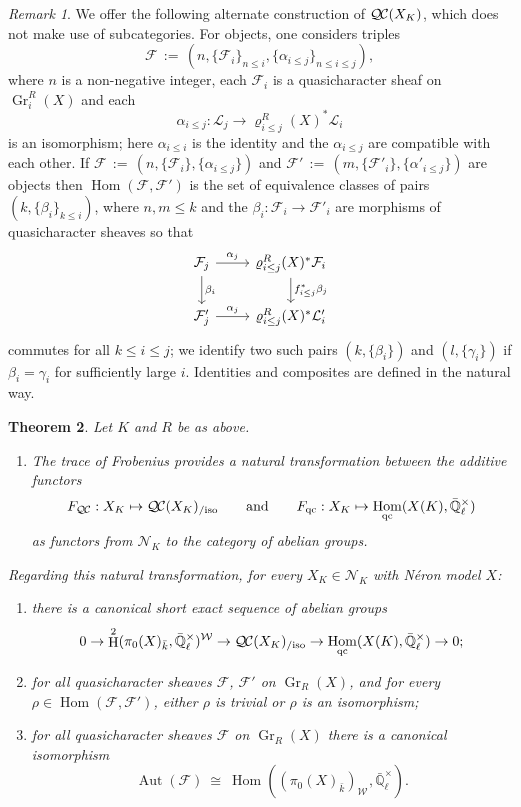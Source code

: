 \documentclass[CM,Submssn,SecEq]{degruyter-crelle} %
\theoremstyle{plain}
\newtheorem{theorem}{Theorem}[section]
\theoremstyle{definition}
\theoremstyle{remark}
\newtheorem{remark}[theorem]{Remark}
\newcommand{\EE}{\mathbb{\bar Q}_\ell}
\newcommand{\bFq}{\bar{k}}
\newcommand{\EEx}{\EE^\times}
\newcommand{\Weil}[1]{\mathcal{W}_{#1}}
\DeclareMathOperator{\Aut}{Aut}
\DeclareMathOperator{\Hom}{Hom}
\DeclareMathOperator{\Gr}{Gr}
\DeclareMathOperator{\Hh}{H}
\newcommand{\ceq}{{\, :=\, }}
\newcommand{\iso}{{\ \cong\ }}
\newcommand{\qcs}[1]{{\mathcal{#1}}}
\newcommand{\QC}{{\mathcal{Q\hskip-0.8pt C}}}
\newcommand{\QCiso}[1]{\QC(#1)_{/\text{iso}}}
\begin{document}
\begin{remark}
We offer the following alternate construction of $\QC(X_K)$, which does not make use of subcategories.
For objects, one considers triples 
\[
\qcs{F} \ceq (n, \{\qcs{F}_i\}_{n\leq i}, \{\alpha_{i \le j}\}_{n\le i \le j}),
\] where $n$
is a non-negative integer, each $\qcs{F}_i$ is a quasicharacter sheaf on $\Gr^R_i(X)$ and each 
\[
\alpha_{i \le j} : \qcs{L}_j \to \varrho^R_{i \le j}(X)^* \qcs{L}_i
\]
 is an isomorphism; here $\alpha_{i \le i}$ is the identity and the $\alpha_{i \le j}$ are compatible with each other.  
If $\qcs{F} \ceq (n, \{\qcs{F}_i\}, \{\alpha_{i \le j}\})$
and $\qcs{F}' \ceq (m, \{\qcs{F}'_i\}, \{\alpha'_{i \le j}\})$ are objects then $\Hom(\qcs{F}, \qcs{F}')$ is the set
of equivalence classes of pairs $(k, \{\beta_i\}_{k \le i})$, where $n,m \le k$ and the $\beta_i : \qcs{F}_i \to \qcs{F}'_i$ are
morphisms of quasicharacter sheaves so that
\[
\begin{tikzcd}
\qcs{F}_j \rar{\alpha_j} \dar{\beta_i} & \varrho^R_{i \le j}(X)^* \qcs{F}_i \dar{f_{i \le j}^*\beta_j} \\
\qcs{F}'_j \rar{\alpha_j} & \varrho^R_{i \le j}(X)^* \qcs{L}'_i
\end{tikzcd}
\]
commutes for all $k\le i\le j$; we identify two such pairs $(k, \{\beta_i\})$ and $(l, \{\gamma_i\})$ if $\beta_i = \gamma_i$
for sufficiently large $i$.  Identities and composites are defined in the natural way.
\end{remark}


\begin{theorem}\label{thm:QCXK}
Let $K$ and $R$ be as above. 
\begin{enumerate}
\item
The trace of Frobenius provides a natural transformation between the additive functors
\[
F_{\QC}: X_K \mapsto \QCiso{X_K}
\qquad\text{and}\qquad
F_{\text{qc}}: X_K \mapsto \Hom_{\text{qc}}(X(K),\EEx)
\]
as functors from $\mathcal{N}_K$ to the category of abelian groups.
\end{enumerate} 
Regarding this natural transformation, for every $X_K \in \mathcal{N}_K$ with N\'eron model $X$:
\begin{enumerate}[resume]
\item there is a canonical short exact sequence of abelian groups 
\[
0 \to \Hh^2(\pi_0(X)_{\bFq},\EEx)^{\Weil{}} \to \QCiso{X_K} \to \Hom_\text{qc}(X(K),\EEx) \to 0;
\] 
\item for all quasicharacter sheaves $\qcs{F}$, $\qcs{F}'$ on $\Gr_R(X)$, and for every $\rho \in \Hom(\qcs{F},\qcs{F}')$, either $\rho$ is trivial or $\rho$ is an isomorphism;
\item for all quasicharacter sheaves $\qcs{F}$ on $\Gr_R(X)$ there is a canonical isomorphism
\[
\Aut(\qcs{F}) \iso \Hom((\pi_0(X)_{\bFq})_{\Weil{}},\EEx).
\]
\end{enumerate}
\end{theorem}
\end{document}
